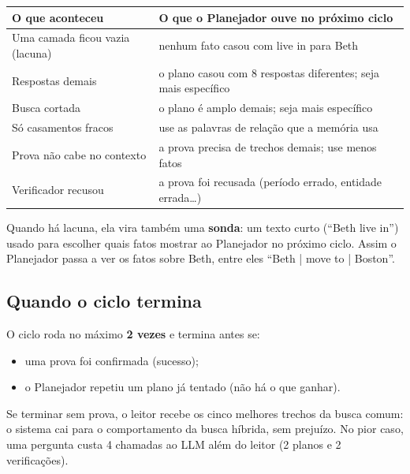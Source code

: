\documentclass[11pt]{article}
\newcommand{\rel}[1]{\textsf{#1}}
\begin{document}
\begin{center}\small
\begin{tabularx}{\textwidth}{@{}l Y@{}}
\toprule
O que aconteceu & O que o Planejador ouve no próximo ciclo \\
\midrule
Uma camada ficou vazia (lacuna) & nenhum fato casou com \rel{live in} para Beth \\
Respostas demais & o plano casou com 8 respostas diferentes; seja mais específico \\
Busca cortada & o plano é amplo demais; seja mais específico \\
Só casamentos fracos & use as palavras de relação que a memória usa \\
Prova não cabe no contexto & a prova precisa de trechos demais; use menos fatos \\
Verificador recusou & a prova foi recusada (período errado, entidade errada\dots) \\
\bottomrule
\end{tabularx}
\end{center}

Quando há lacuna, ela vira também uma \textbf{sonda}: um texto curto (``Beth
live in'') usado para escolher quais fatos mostrar ao Planejador no próximo
ciclo. Assim o Planejador passa a ver os fatos sobre Beth, entre eles
``Beth | move to | Boston''.

\subsection{Quando o ciclo termina}

O ciclo roda no máximo \textbf{2 vezes} e termina antes se:
\begin{itemize}
\item uma prova foi confirmada (sucesso);
\item o Planejador repetiu um plano já tentado (não há o que ganhar).
\end{itemize}
Se terminar sem prova, o leitor recebe os cinco melhores trechos da busca comum:
o sistema cai para o comportamento da busca híbrida, sem prejuízo. No pior caso,
uma pergunta custa 4 chamadas ao LLM além do leitor (2 planos e 2 verificações).
\end{document}
